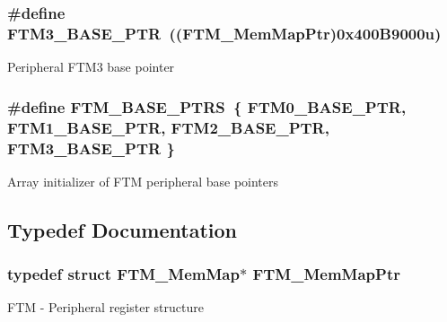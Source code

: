\subsubsection[{F\+T\+M3\+\_\+\+B\+A\+S\+E\+\_\+\+P\+T\+R}]{\setlength{\rightskip}{0pt plus 5cm}\#define F\+T\+M3\+\_\+\+B\+A\+S\+E\+\_\+\+P\+T\+R~(({\bf F\+T\+M\+\_\+\+Mem\+Map\+Ptr})0x400\+B9000u)}\label{group___f_t_m___peripheral_ga32dd0c357080d5680c0c5b3cf821adab}
Peripheral F\+T\+M3 base pointer \hypertarget{group___f_t_m___peripheral_ga1a5a7cb39d1713239478a1ebce2f05cc}{}
\subsubsection[{F\+T\+M\+\_\+\+B\+A\+S\+E\+\_\+\+P\+T\+R\+S}]{\setlength{\rightskip}{0pt plus 5cm}\#define F\+T\+M\+\_\+\+B\+A\+S\+E\+\_\+\+P\+T\+R\+S~\{ {\bf F\+T\+M0\+\_\+\+B\+A\+S\+E\+\_\+\+P\+T\+R}, {\bf F\+T\+M1\+\_\+\+B\+A\+S\+E\+\_\+\+P\+T\+R}, {\bf F\+T\+M2\+\_\+\+B\+A\+S\+E\+\_\+\+P\+T\+R}, {\bf F\+T\+M3\+\_\+\+B\+A\+S\+E\+\_\+\+P\+T\+R} \}}\label{group___f_t_m___peripheral_ga1a5a7cb39d1713239478a1ebce2f05cc}
Array initializer of F\+T\+M peripheral base pointers 

\subsection{Typedef Documentation}
\hypertarget{group___f_t_m___peripheral_gaafa7875c9deb2b3afe4aa22ce6a99d39}{}
\subsubsection[{F\+T\+M\+\_\+\+Mem\+Map\+Ptr}]{\setlength{\rightskip}{0pt plus 5cm}typedef struct {\bf F\+T\+M\+\_\+\+Mem\+Map}$\ast$ {\bf F\+T\+M\+\_\+\+Mem\+Map\+Ptr}}\label{group___f_t_m___peripheral_gaafa7875c9deb2b3afe4aa22ce6a99d39}
F\+T\+M -\/ Peripheral register structure 